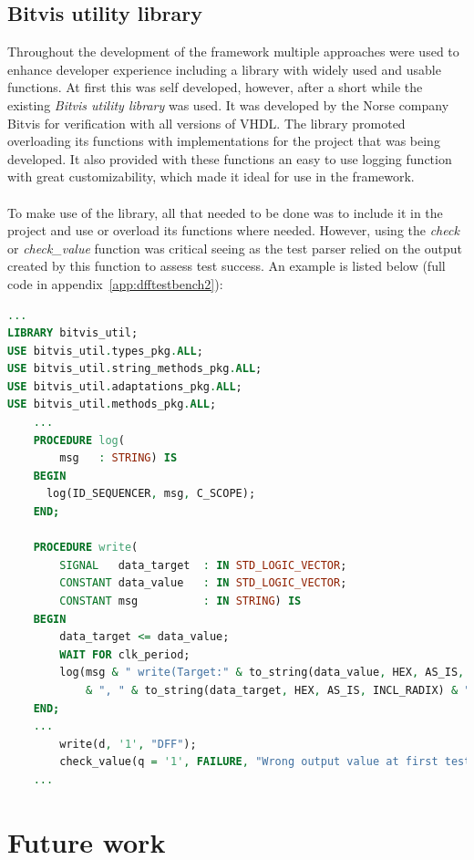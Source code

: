 \documentclass[11pt,british]{article}
\begin{document}
\subsection{Bitvis utility library}
\label{subsec:bitvis}
Throughout the development of the framework multiple approaches were used to enhance developer experience including a library with widely used and usable functions. At first this was self developed, however, after a short while the existing \emph{Bitvis utility library} was used. It was developed by the Norse company Bitvis for verification with all versions of \gls{VHDL}. \cite{bitvis} The library promoted overloading its functions with implementations for the project that was being developed. It also provided with these functions an easy to use logging function with great customizability, which made it ideal for use in the framework.
\\
\\
To make use of the library, all that needed to be done was to include it in the project and use or overload its functions where needed. However, using the \emph{check} or \emph{check\_value} function was critical seeing as the test parser relied on the output created by this function to assess test success. An example is listed below (full code in appendix~\ref{app:dfftestbench2}):
\begin{lstlisting}[language=VHDL, tabsize=4, frame=single, framesep=2mm, belowskip=8pt, aboveskip=8pt, showstringspaces=false, basicstyle=\footnotesize]
...
LIBRARY bitvis_util;
USE bitvis_util.types_pkg.ALL;
USE bitvis_util.string_methods_pkg.ALL;
USE bitvis_util.adaptations_pkg.ALL;
USE bitvis_util.methods_pkg.ALL;
	...
	PROCEDURE log(
    	msg   : STRING) IS
    BEGIN
      log(ID_SEQUENCER, msg, C_SCOPE);
    END;
    
	PROCEDURE write(
    	SIGNAL   data_target  : IN STD_LOGIC_VECTOR;
    	CONSTANT data_value   : IN STD_LOGIC_VECTOR;
    	CONSTANT msg          : IN STRING) IS
    BEGIN
    	data_target <= data_value;
    	WAIT FOR clk_period;
    	log(msg & " write(Target:" & to_string(data_value, HEX, AS_IS, INCL_RADIX) 
    		& ", " & to_string(data_target, HEX, AS_IS, INCL_RADIX) & ")";);
    END;
	...
		write(d, '1', "DFF");
		check_value(q = '1', FAILURE, "Wrong output value at first test");
	...
\end{lstlisting}


\newpage{}
\section{Future work}
\end{document}
